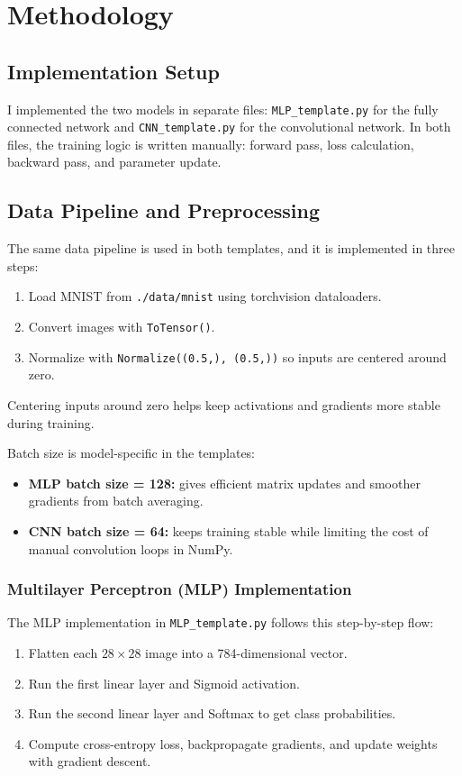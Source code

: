\section{Methodology}

\subsection{Implementation Setup}
I implemented the two models in separate files: \texttt{MLP\_template.py} for the fully connected network and \texttt{CNN\_template.py} for the convolutional network. In both files, the training logic is written manually: forward pass, loss calculation, backward pass, and parameter update.

\subsection{Data Pipeline and Preprocessing}
The same data pipeline is used in both templates, and it is implemented in three steps:
\begin{enumerate}
    \item Load MNIST from \texttt{./data/mnist} using torchvision dataloaders.
    \item Convert images with \texttt{ToTensor()}.
    \item Normalize with \texttt{Normalize((0.5,), (0.5,))} so inputs are centered around zero.
\end{enumerate}
Centering inputs around zero helps keep activations and gradients more stable during training.

Batch size is model-specific in the templates:
\begin{itemize}
    \item \textbf{MLP batch size = 128:} gives efficient matrix updates and smoother gradients from batch averaging.
    \item \textbf{CNN batch size = 64:} keeps training stable while limiting the cost of manual convolution loops in NumPy.
\end{itemize}

\subsubsection{Multilayer Perceptron (MLP) Implementation}
The MLP implementation in \texttt{MLP\_template.py} follows this step-by-step flow:
\begin{enumerate}
    \item Flatten each $28\times 28$ image into a 784-dimensional vector.
    \item Run the first linear layer and Sigmoid activation.
    \item Run the second linear layer and Softmax to get class probabilities.
    \item Compute cross-entropy loss, backpropagate gradients, and update weights with gradient descent.
\end{enumerate}

